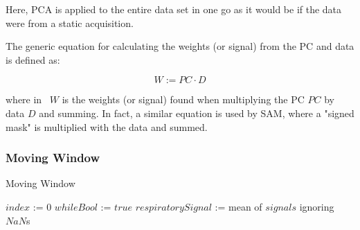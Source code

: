             Here, \gls{PCA} is applied to the entire data set in one go as it would be if the data were from a static acquisition.
            
            The generic equation for calculating the weights (or signal) from the \gls{PC} and data is defined as:
            
            \begin{equation} \label{eq:pc_weights}
                W := PC \cdot D
            \end{equation}
            
            \noindent where in~ $W$ is the weights (or signal) found when multiplying the \gls{PC} $PC$ by data $D$ and summing. In fact, a similar equation is used by \gls{SAM}, where a "signed mask" is multiplied with the data and summed.
        
            
        \subsubsection{Moving Window} \label{sec:moving_window}
            \begin{algorithm}
                \caption{Moving Window}
                \;
                $index$ := $0$
                $whileBool$ := $true$
                \;
                $respiratorySignal$ := mean of $signals$ ignoring $NaN$s
            \end{algorithm} \label{eq:moving_window_pseudo_code}
            
